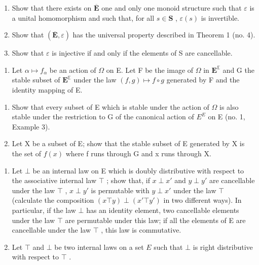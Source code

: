\begin{enumerate}
\def\labelenumi{(\alph{enumi})}
\setcounter{enumi}{1}
\item
  Show that there exists on \(\overline{\mathbf{E}}\) one and only one monoid structure such that \(\varepsilon\) is a unital homomorphism and such that, for all \(s \in \mathbf{S}\) , \(\varepsilon(s)\) is invertible.
\item
  Show that \((\overline{\mathbf{E}},\varepsilon)\) has the universal property described in Theorem 1 (no. 4).
\item
  Show that \(\varepsilon\) is injective if and only if the elements of S are cancellable.
\end{enumerate}

\BourbakiExercisesSection

\begin{enumerate}
\def\labelenumi{\arabic{enumi}.}
\tightlist
\item
  Let \(\alpha \mapsto f_{\alpha}\) be an action of \(\Omega\) on E. Let F be the image of \(\Omega\) in \(\mathbf{E}^{\mathbb{E}}\) and G the stable subset of \(\mathbf{E}^{\mathbb{E}}\) under the law \((f,g) \mapsto f \circ g\) generated by F and the identity mapping of E.
\end{enumerate}

\begin{enumerate}
\def\labelenumi{(\alph{enumi})}
\item
  Show that every subset of E which is stable under the action of \(\Omega\) is also stable under the restriction to G of the canonical action of \(E^{E}\) on E (no. 1, Example 3).
\item
  Let X be a subset of E; show that the stable subset of E generated by X is the set of \(f(x)\) where f runs through G and x runs through X.
\end{enumerate}

\begin{enumerate}
\def\labelenumi{\arabic{enumi}.}
\setcounter{enumi}{1}
\item
  Let \(\bot\) be an internal law on E which is doubly distributive with respect to the associative internal law \(\top\) ; show that, if \(x \perp x'\) and \(y \perp y'\) are cancellable under the law \(\top\) , \(x \perp y'\) is permutable with \(y \perp x'\) under the law \(\top\) (calculate the composition \((x \top y) \perp (x' \top y')\) in two different ways). In particular, if the law \(\bot\) has an identity element, two cancellable elements under the law \(\top\) are permutable under this law; if all the elements of E are cancellable under the law \(\top\) , this law is commutative.
\item
  Let \(\top\) and \(\bot\) be two internal laws on a set \(E\) such that \(\bot\) is right distributive with respect to \(\top\) .
\end{enumerate}

